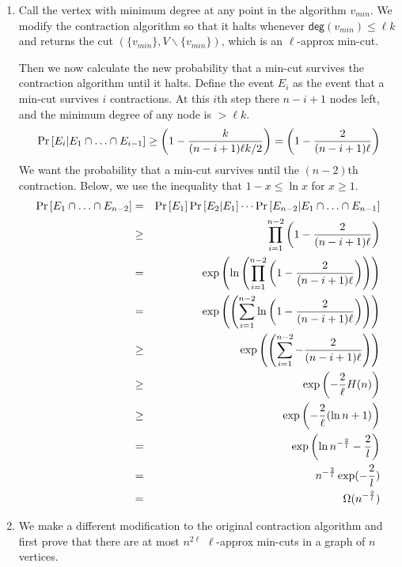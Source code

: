 \documentclass[12pt]{article}
\def\PR#1{\mathop{\rm {Pr}}\left[#1\right]}
\begin{document}
\begin{enumerate}
\item %
Call the vertex with minimum degree at any point in the algorithm
$v_{min}$.
We modify the contraction algorithm so that it halts whenever
$\textsf{deg}(v_{min}) \le \ell k$ and returns the cut
$(\{v_{min}\}, V \backslash \{v_{min}\})$, which is an $\ell$-approx min-cut.

Then we now calculate the new probability that a min-cut survives the
contraction algorithm until it halts. Define the event $E_i$ as the event
that a min-cut survives $i$ contractions.
At this $i$th step there $n-i+1$ nodes left,
and the minimum degree of any node is $> \ell k$.
%
\begin{displaymath}
\PR{E_i | E_1 \cap \ldots \cap E_{i-1}} \ge \left(1 - \frac{k}{(n-i+1)\ell k / 2}\right) = \left(1 - \frac{2}{(n-i+1)\ell}\right)
\end{displaymath}
%
We want the probability that a min-cut survives until the $(n-2)$th
contraction. Below, we use the inequality that $1-x \le \ln x$ for $x \ge 1$.
%
\begin{eqnarray*}
\PR{E_1 \cap \ldots \cap E_{n-2}} & = &
\PR{E_1}\PR{E_2 | E_1} \cdots\PR{E_{n-2} | E_1 \cap \ldots \cap E_{n-1}}\\
& \ge & \prod_{i = 1}^{n-2} \left(1 - \frac{2}{(n-i+1)\ell}\right)\\
& = & \exp\left(\ln\left(\prod_{i = 1}^{n-2} \left(1 - \frac{2}{(n-i+1)\ell}\right)\right)\right)\\
& = & \exp\left(\left(\sum_{i = 1}^{n-2} \ln\left(1 - \frac{2}{(n-i+1)\ell}\right)\right)\right)\\
& \ge & \exp\left(\left(\sum_{i = 1}^{n-2} - \frac{2}{(n-i+1)\ell}\right)\right)\\
& \ge & \exp\left(-\frac{2}{\ell}H(n)\right)\\
& \ge & \exp\left(-\frac{2}{\ell}(\ln n +1)\right)\\
& = & \exp\left(\ln n^{-\frac{2}{l}} - \frac{2}{l}\right)\\
& = & n^{-\frac{2}{l}}\exp(-\frac{2}{l})\\
& = & \Omega(n^{-\frac{2}{l}})
\end{eqnarray*}

\pagebreak
\item %
We make a different modification to the original contraction algorithm
and first prove
that there are at most $n^{2\ell}$ $\ell$-approx min-cuts in a graph of
$n$ vertices.


\end{enumerate}
\end{document}
